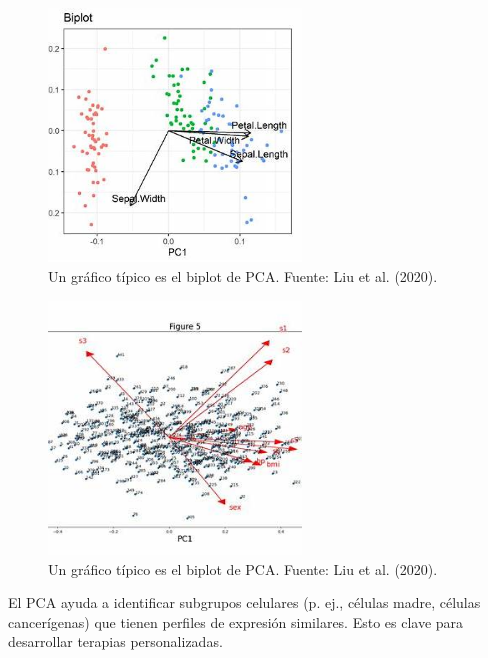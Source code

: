 \documentclass[12pt]{article}
\begin{document}
        \vspace{1em}
        \noindent

        \begin{figure}[H]
                \centering
                \includegraphics[width=0.6\textwidth]{imagenes/pca_biplot_genomics.png}
                \caption{Un gráfico típico es el biplot de PCA. Fuente: Liu et al. (2020).}
                \label{fig:Imagen3}
        \end{figure}
        \vspace{1cm}
        \begin{figure}[H]
                \centering
                \includegraphics[width=0.6\textwidth]{imagenes/pca_biplot_genomics1.png}
                \caption{Un gráfico típico es el biplot de PCA. Fuente: Liu et al. (2020).}
                \label{fig:Imagen4}
        \end{figure}

        \noindent
        
        
        \vspace{1em}
        \noindent
        El PCA ayuda a identificar subgrupos celulares (p. ej., células madre, células cancerígenas) que tienen perfiles de expresión similares. Esto es clave para desarrollar terapias personalizadas.
        
\end{document}
